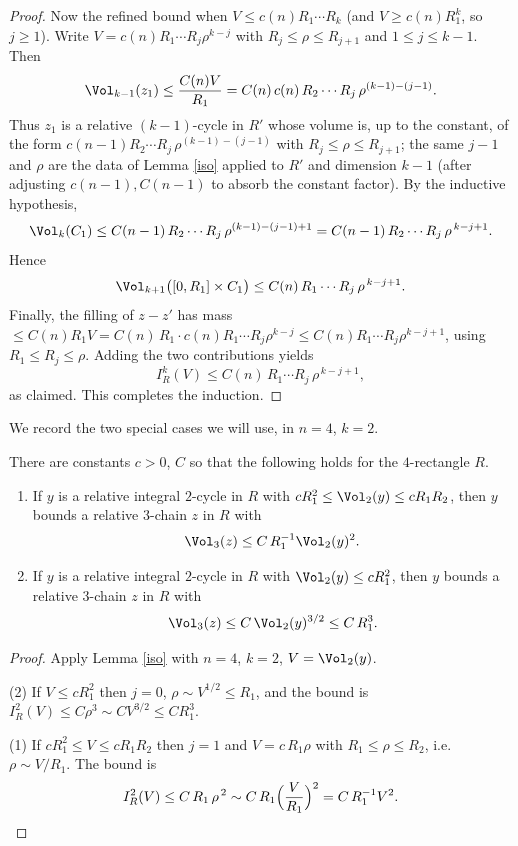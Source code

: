 \begin{proof}
Now the refined bound when $V\le c(n)R_1\cdots R_k$ (and $V\ge c(n)R_1^k$, so $j\ge1$). Write $V=c(n)R_1\cdots R_j\rho^{k-j}$ with $R_j\le\rho\le R_{j+1}$ and $1\le j\le k-1$. Then
\[
\Vol_{k-1}(z_1)\le \frac{C(n)V}{R_1}= C(n)\,c(n)\,R_2\cdots R_j\,\rho^{(k-1)-(j-1)} .
\]
Thus $z_1$ is a relative $(k-1)$-cycle in $R'$ whose volume is, up to the constant, of the form $c(n-1)R_2\cdots R_j\,\rho^{(k-1)-(j-1)}$ with $R_j\le\rho\le R_{j+1}$; the same $j-1$ and $\rho$ are the data of Lemma \ref{iso} applied to $R'$ and dimension $k-1$ (after adjusting $c(n-1),C(n-1)$ to absorb the constant factor). By the inductive hypothesis,
\[
\Vol_k(C_1)\le C(n-1)\,R_2\cdots R_j\,\rho^{(k-1)-(j-1)+1}=C(n-1)\,R_2\cdots R_j\,\rho^{\,k-j+1}.
\]
Hence
\[
\Vol_{k+1}\big([0,R_1]\times C_1\big)\le C(n)\,R_1\cdots R_j\,\rho^{\,k-j+1}.
\]
Finally, the filling of $z-z'$ has mass $\le C(n)R_1V=C(n)\,R_1\cdot c(n)R_1\cdots R_j\rho^{k-j}\le C(n)R_1\cdots R_j\rho^{k-j+1}$, using $R_1\le R_j\le\rho$. Adding the two contributions yields
\[
I_R^k(V)\le C(n)\,R_1\cdots R_j\,\rho^{\,k-j+1},
\]
as claimed. This completes the induction.
\end{proof}

We record the two special cases we will use, in $n=4$, $k=2$.

\begin{lemma}\label{iso2}
There are constants $c>0$, $C$ so that the following holds for the $4$-rectangle $R$.
\begin{enumerate}
\item If $y$ is a relative integral $2$-cycle in $R$ with $cR_1^2\le \Vol_2(y)\le cR_1R_2$, then $y$ bounds a relative $3$-chain $z$ in $R$ with
\[
\Vol_3(z)\le C\,R_1^{-1}\Vol_2(y)^2 .
\]
\item If $y$ is a relative integral $2$-cycle in $R$ with $\Vol_2(y)\le cR_1^2$, then $y$ bounds a relative $3$-chain $z$ in $R$ with
\[
\Vol_3(z)\le C\,\Vol_2(y)^{3/2}\le C\,R_1^3 .
\]
\end{enumerate}
\end{lemma}

\begin{proof}
Apply Lemma \ref{iso} with $n=4$, $k=2$, $V=\Vol_2(y)$.

(2) If $V\le cR_1^2$ then $j=0$, $\rho\sim V^{1/2}\le R_1$, and the bound is $I_R^2(V)\le C\rho^3\sim CV^{3/2}\le CR_1^3$.

(1) If $cR_1^2\le V\le cR_1R_2$ then $j=1$ and $V=c\,R_1\rho$ with $R_1\le\rho\le R_2$, i.e.\ $\rho\sim V/R_1$. The bound is
\[
I_R^2(V)\le C\,R_1\,\rho^{\,2}\sim C\,R_1\Big(\frac{V}{R_1}\Big)^2=C\,R_1^{-1}V^2 .\qedhere
\]
\end{proof}

